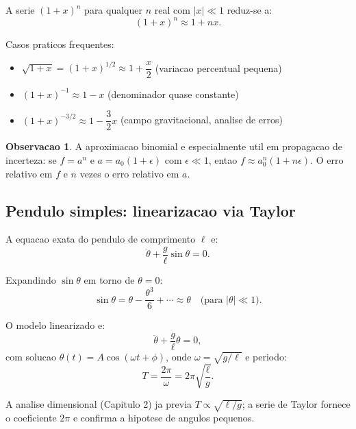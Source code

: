 \documentclass[12pt,a4paper,oneside]{book}
\theoremstyle{definition}
\newtheorem{remark}[definition]{Observacao}
\begin{document}
A serie $(1+x)^n$ para qualquer $n$ real com $|x| \ll 1$ reduz-se a:
\begin{equation}
(1+x)^n \approx 1 + nx.
\end{equation}

Casos praticos frequentes:
\begin{itemize}
    \item $\sqrt{1+x} = (1+x)^{1/2} \approx 1 + \dfrac{x}{2}$ \quad (variacao percentual pequena)
    \item $(1+x)^{-1} \approx 1 - x$ \quad (denominador quase constante)
    \item $(1+x)^{-3/2} \approx 1 - \dfrac{3}{2}x$ \quad (campo gravitacional, analise de erros)
\end{itemize}

\begin{remark}
A aproximacao binomial e especialmente util em propagacao de incerteza:
se $f = a^n$ e $a = a_0(1+\epsilon)$ com $\epsilon \ll 1$, entao $f \approx a_0^n(1+n\epsilon)$.
O erro relativo em $f$ e $n$ vezes o erro relativo em $a$.
\end{remark}

\subsection{Pendulo simples: linearizacao via Taylor}

A equacao exata do pendulo de comprimento $\ell$ e:
\begin{equation}
\ddot{\theta} + \frac{g}{\ell}\sin\theta = 0.
\end{equation}

Expandindo $\sin\theta$ em torno de $\theta = 0$:
\begin{equation}
\sin\theta = \theta - \frac{\theta^3}{6} + \cdots \approx \theta \quad \text{(para } |\theta| \ll 1\text{)}.
\end{equation}

O modelo linearizado e:
\begin{equation}
\ddot{\theta} + \frac{g}{\ell}\theta = 0,
\end{equation}
com solucao $\theta(t) = A\cos(\omega t + \phi)$, onde $\omega = \sqrt{g/\ell}$ e periodo:
\begin{equation}
T = \frac{2\pi}{\omega} = 2\pi\sqrt{\frac{\ell}{g}}.
\end{equation}

A analise dimensional (Capitulo 2) ja previa $T \propto \sqrt{\ell/g}$; a serie de Taylor fornece
o coeficiente $2\pi$ e confirma a hipotese de angulos pequenos.
\end{document}
